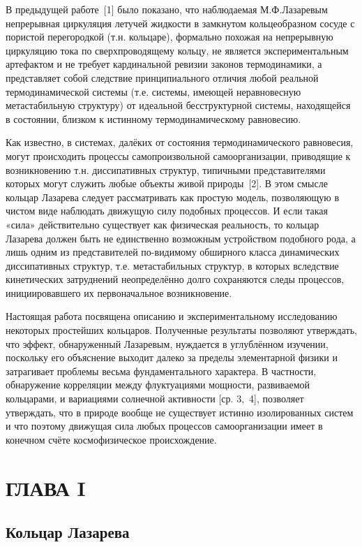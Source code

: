 \documentclass[12pt,a4paper]{article}
\begin{document}
В предыдущей работе~[1] было показано, что наблюдаемая М.Ф.Лазаревым
непрерывная циркуляция летучей жидкости в замкнутом кольцеобразном сосуде
с пористой перегородкой (т.н. кольцаре), формально похожая на непрерывную
циркуляцию тока по сверхпроводящему кольцу, не является экспериментальным
артефактом и не требует кардинальной ревизии законов термодинамики, а
представляет собой следствие принципиального отличия любой реальной
термодинамической системы (т.е. системы, имеющей неравновесную метастабильную
структуру) от идеальной бесструктурной системы, находящейся в состоянии,
близком к истинному термодинамическому равновесию.

Как известно, в системах, далёких от состояния термодинамического
равновесия, могут происходить процессы самопроизвольной самоорганизации,
приводящие к возникновению т.н. диссипативных структур, типичными
представителями которых могут служить любые объекты живой природы~[2]. В
этом смысле кольцар Лазарева следует рассматривать как простую модель,
позволяющую в чистом виде наблюдать движущую силу подобных процессов. И
если такая «сила» действительно существует как физическая реальность, то
кольцар Лазарева должен быть не единственно возможным устройством подобного
рода, а лишь одним из представителей по-видимому обширного класса динамических
диссипативных структур, т.е. метастабильных структур, в которых вследствие
кинетических затруднений неопределённо долго сохраняются следы процессов,
инициировавшего их первоначальное возникновение.

Настоящая работа посвящена описанию и экспериментальному исследованию
некоторых простейших кольцаров. Полученные результаты позволяют утверждать,
что эффект, обнаруженный Лазаревым, нуждается в углублённом изучении,
поскольку его объяснение выходит далеко за пределы элементарной физики и
затрагивает проблемы весьма фундаментального характера. В частности,
обнаружение корреляции между флуктуациями мощности, развиваемой кольцарами,
и вариациями солнечной активности [ср. 3,~4], позволяет утверждать, что в
природе вообще не существует истинно изолированных систем и что поэтому
движущая сила любых процессов самоорганизации имеет в конечном счёте
космофизическое происхождение.

\newpage
\section*{ГЛАВА I}
\subsection*{Кольцар Лазарева}
\end{document}
